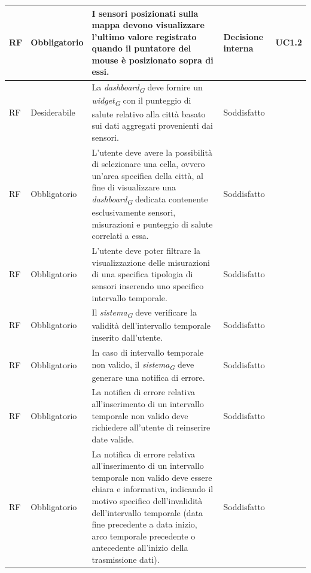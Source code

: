 \begin{longtable}{|C{1.5cm}|C{2cm}|L{5cm}|C{2cm}|C{1.5cm}|}
    \hline
     RF & Obbligatorio &  I sensori posizionati sulla mappa devono visualizzare l'ultimo valore registrato quando il puntatore del mouse è posizionato sopra di essi.& Decisione interna & UC1.2 \\
    
    \hline
     RF & Desiderabile & La \textit{dashboard}\textsubscript{\textit{G}} deve fornire un \textit{widget}\textsubscript{\textit{G}} con il punteggio di salute relativo alla città basato sui dati aggregati provenienti dai sensori.& Soddisfatto \\
    
    \hline
     RF & Obbligatorio & L'utente deve avere la possibilità di selezionare una cella, ovvero un'area specifica della città, al fine di visualizzare una \textit{dashboard}\textsubscript{\textit{G}} dedicata contenente esclusivamente sensori, misurazioni e punteggio di salute correlati a essa.& Soddisfatto \\
    
    \hline
     RF & Obbligatorio & L'utente deve poter filtrare la visualizzazione delle misurazioni di una specifica tipologia di sensori inserendo uno specifico intervallo temporale.& Soddisfatto \\
    
    \hline
     RF & Obbligatorio & Il \textit{sistema}\textsubscript{\textit{G}} deve verificare la validità dell'intervallo temporale inserito dall'utente.& Soddisfatto \\
    
    \hline
     RF & Obbligatorio & In caso di intervallo temporale non valido, il \textit{sistema}\textsubscript{\textit{G}} deve generare una notifica di errore.& Soddisfatto \\
    
    \hline
     RF & Obbligatorio & La notifica di errore relativa all'inserimento di un intervallo temporale non valido deve richiedere all'utente di reinserire date valide.& Soddisfatto \\
    
    \hline
     RF & Obbligatorio & La notifica di errore relativa all'inserimento di un intervallo temporale non valido deve essere chiara e informativa, indicando il motivo specifico dell'invalidità dell'intervallo temporale (data fine precedente a data inizio, arco temporale precedente o antecedente all'inizio della trasmissione dati).& Soddisfatto \\
    

\end{longtable}
